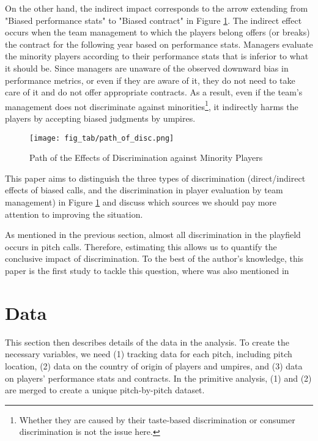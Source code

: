\documentclass[dvipdfmx, 12pt]{jsarticle}
\begin{document}
On the other hand, the indirect impact corresponds to the arrow extending from "Biased performance stats" to "Biased contract" in Figure \ref{fig_path_disc}. The indirect effect occurs when the team management to which the players belong offers (or breaks) the contract for the following year based on performance stats. Managers evaluate the minority players according to their performance stats that is inferior to what it should be. Since managers are unaware of the observed downward bias in performance metrics, or even if they are aware of it, they do not need to take care of it and do not offer appropriate contracts. As a result, even if the team's management does not discriminate against minorities\footnote{Whether they are caused by their taste-based discrimination or consumer discrimination is not the issue here.}, it indirectly harms the players by accepting biased judgments by umpires. 

\begin{figure}[t]
  \centering
  \caption{Path of the Effects of Discrimination against Minority Players}
  \texttt{[image: fig\_tab/path\_of\_disc.png]}
  \label{fig_path_disc}
\end{figure}

This paper aims to distinguish the three types of discrimination (direct/indirect effects of biased calls, and the discrimination in player evaluation by team management) in Figure \ref{fig_path_disc} and discuss which sources we should pay more attention to improving the situation.

As mentioned in the previous section, almost all discrimination in the playfield occurs in pitch calls. Therefore, estimating this allows us to quantify the conclusive impact of discrimination. To the best of the author's knowledge, this paper is the first study to tackle this question, where was also mentioned in \citet{Parsons_etal_2011}

\section{Data}

This section then describes details of the data in the analysis. To create the necessary variables, we need (1) tracking data for each pitch, including pitch location, (2) data on the country of origin of players and umpires, and (3) data on players' performance stats and contracts. In the primitive analysis, (1) and (2) are merged to create a unique pitch-by-pitch dataset. 
\end{document}
